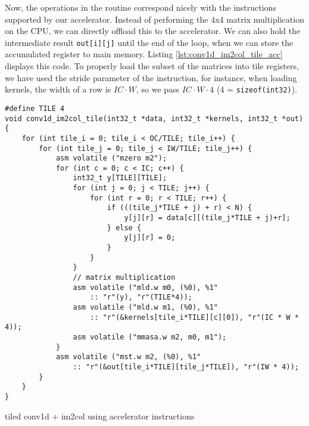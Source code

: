 \documentclass[acmsmall, nonacm=true]{acmart}
\begin{document}
Now, the operations in the routine correspond nicely with the instructions supported by our accelerator. Instead of performing the 4x4 matrix multiplication on the CPU, we can directly offload this to the accelerator. We can also hold the intermediate result \verb|out[i][j]| until the end of the loop, when we can store the accumulated register to main memory. Listing \ref{lst:conv1d_im2col_tile_acc} displays this code. To properly load the subset of the matrices into tile registers, we have used the stride parameter of the instruction, for instance, when loading kernels, the width of a row is $IC\cdot W$, so we pass $IC\cdot W \cdot 4$ (4 = \verb|sizeof(int32)|).

\begin{listing}
    \centering
    \begin{verbatim}
#define TILE 4
void conv1d_im2col_tile(int32_t *data, int32_t *kernels, int32_t *out) {
    for (int tile_i = 0; tile_i < OC/TILE; tile_i++) {
        for (int tile_j = 0; tile_j < IW/TILE; tile_j++) {
            asm volatile ("mzero m2");
            for (int c = 0; c < IC; c++) {
                int32_t y[TILE][TILE];
                for (int j = 0; j < TILE; j++) {
                    for (int r = 0; r < TILE; r++) {
                        if (((tile_j*TILE + j) + r) < N) {
                            y[j][r] = data[c][(tile_j*TILE + j)+r];
                        } else {
                            y[j][r] = 0;
                        }                    
                    }
                }
                // matrix multiplication
                asm volatile ("mld.w m0, (%0), %1"
                    :: "r"(y), "r"(TILE*4));
                asm volatile ("mld.w m1, (%0), %1"
                    :: "r"(&kernels[tile_i*TILE][c][0]), "r"(IC * W * 4));
                asm volatile ("mmasa.w m2, m0, m1");
            }
            asm volatile ("mst.w m2, (%0), %1"
                :: "r"(&out[tile_i*TILE][tile_j*TILE]), "r"(IW * 4));
        }
    }
}
\end{verbatim}
    \caption{tiled conv1d + im2col using accelerator instructions}
    \label{lst:conv1d_im2col_tile_acc}
\end{listing}
\end{document}
